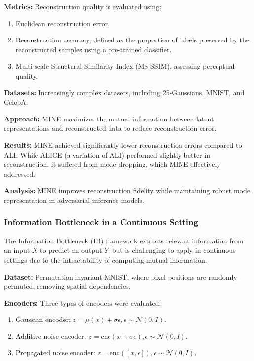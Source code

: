\documentclass[lettersize,journal]{IEEEtran}
\begin{document}
\textbf{Metrics:} Reconstruction quality is evaluated using:
\begin{enumerate}
    \item Euclidean reconstruction error.
    \item Reconstruction accuracy, defined as the proportion of labels preserved by the reconstructed samples using a pre-trained classifier.
    \item Multi-scale Structural Similarity Index (MS-SSIM), assessing perceptual quality.
\end{enumerate}

\textbf{Datasets:} Increasingly complex datasets, including 25-Gaussians, MNIST, and CelebA.

\textbf{Approach:} MINE maximizes the mutual information between latent representations and reconstructed data to reduce reconstruction error.

\textbf{Results:}
MINE achieved significantly lower reconstruction errors compared to ALI. 
While ALICE (a variation of ALI) performed slightly better in reconstruction, it suffered from mode-dropping, which MINE effectively addressed.

\textbf{Analysis:} 
MINE improves reconstruction fidelity while maintaining robust mode representation in adversarial inference models.

\subsubsection{Information Bottleneck in a Continuous Setting}
The Information Bottleneck (IB) framework extracts relevant information from an input \(X\) to predict an output \(Y\), but is challenging to apply in continuous settings due to the intractability of computing mutual information.

\textbf{Dataset:} Permutation-invariant MNIST, where pixel positions are randomly permuted, removing spatial dependencies.

\textbf{Encoders:} Three types of encoders were evaluated:
\begin{enumerate}
    \item Gaussian encoder: \( z = \mu(x) + \sigma \epsilon, \epsilon \sim \mathcal{N}(0, I) \).
    \item Additive noise encoder: \( z = \text{enc}(x + \sigma \epsilon), \epsilon \sim \mathcal{N}(0, I) \).
    \item Propagated noise encoder: \( z = \text{enc}([x, \epsilon]), \epsilon \sim \mathcal{N}(0, I) \).
\end{enumerate}
\end{document}
